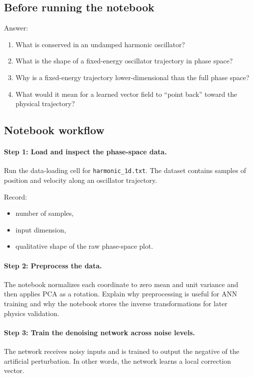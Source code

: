 \subsection*{Before running the notebook}
Answer:
\begin{enumerate}
    \item What is conserved in an undamped harmonic oscillator?
    \item What is the shape of a fixed-energy oscillator trajectory in phase space?
    \item Why is a fixed-energy trajectory lower-dimensional than the full phase space?
    \item What would it mean for a learned vector field to ``point back'' toward the physical trajectory?
\end{enumerate}

\subsection*{Notebook workflow}

\paragraph{Step 1: Load and inspect the phase-space data.}
Run the data-loading cell for \texttt{harmonic\_1d.txt}. The dataset contains samples of position and velocity along an oscillator trajectory.

Record:
\begin{itemize}
    \item number of samples,
    \item input dimension,
    \item qualitative shape of the raw phase-space plot.
\end{itemize}

\paragraph{Step 2: Preprocess the data.}
The notebook normalizes each coordinate to zero mean and unit variance and then applies PCA as a rotation. Explain why preprocessing is useful for ANN training and why the notebook stores the inverse transformations for later physics validation.

\paragraph{Step 3: Train the denoising network across noise levels.}
The network receives noisy inputs and is trained to output the negative of the artificial perturbation. In other words, the network learns a local correction vector.

